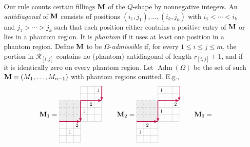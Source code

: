 \documentclass[12pt]{amsart}
\DeclareMathOperator{\Std}{\operatorname{Adm}}
\newcommand{\cell}{.28}
\newcommand{\tile}[5]{%
\begin{scope}[shift={(#1,#2)}]
  \draw[line width =.1pt, step=\cell] (0,0) grid ({#3*\cell},{#4*\cell});
  #5
\end{scope}
}
\newcommand{\phantomtile}[5]{%
\begin{scope}[shift={(#1,#2)}]
  \fill[gray!15] (0,0) rectangle ({#3*\cell},{#4*\cell});
  \draw[gray!70, dashed, step=\cell] (0,0) grid ({#3*\cell},{#4*\cell});
  #5
\end{scope}
}
\newcommand{\numcell}[3]{%
  \node at ({(#1+.5)*\cell},{(2.5-#2)*\cell}) {\scriptsize $#3$};
}
\theoremstyle{definition}
\theoremstyle{remark}
\begin{document}
Our rule counts certain fillings ${\bf M}$ of the $Q$-shape by nonnegative integers. An \emph{antidiagonal} of ${\bf M}$ consists of positions  $(i_1,j_1),\dots,(i_k,j_k)$ with $i_1<\cdots<i_k$ and $j_1>\cdots>j_k$ 
such that each position either contains a positive entry of ${\bf M}$ or lies in a 
phantom region. It is \emph{phantom} if it uses at least one position in a phantom region. Define
${\bf M}$ to be $\Omega$-\emph{admissible} if, for every $1\leq i\leq j\leq m$, the portion in ${\mathcal R}_{[i,j]}$ contains no (phantom) 
antidiagonal of length $r_{[i,j]}+1$, and if it is identically zero on every phantom region. Let $\Std(\Omega)$ be the set of 
such ${\bf M}=(M_1,\ldots,M_{n-1})$ with phantom regions omitted. E.g., 
\[{\bf M}_1=\vcenter{\hbox{\begin{tikzpicture}[scale=1.3, baseline=-.5ex]

\tile{0}{0}{3}{3}{
  \numcell{2}{0}{2}
  \numcell{1}{1}{1}
}

{\phantomtile{0}{.84}{3}{3}{
}}

\tile{.84}{.84}{3}{3}{
  \numcell{0}{1}{1}
  \numcell{1}{0}{2}
}

\tile{.84}{1.68}{3}{2}{
  \numcell{2}{1}{1}
}

\draw[purple, -{Stealth[length=2mm,width=1.5mm]}, thick] (0,.84) -- (.84,.84);
\draw[purple, -{Stealth[length=2mm,width=1.5mm]}, thick] (.84,1.68) -- (.84,.84);
\draw[purple, -{Stealth[length=2mm,width=1.5mm]}, thick] (.84,1.68) -- (1.68,1.68);
\draw[purple, -{Stealth[length=2mm,width=1.5mm]}, thick] (1.68,2.27) -- (1.68,1.68);
\end{tikzpicture}}}
\qquad
{\bf M}_2=\vcenter{\hbox{\begin{tikzpicture}[scale=1.3, baseline=-.5ex]

\tile{0}{0}{3}{3}{
  \numcell{1}{0}{2}
  \numcell{0}{1}{1}
}

{\phantomtile{0}{.84}{3}{3}{
}}

\tile{.84}{.84}{3}{3}{
  \numcell{0}{1}{1}
  \numcell{2}{0}{2}
}

\tile{.84}{1.68}{3}{2}{
  \numcell{0}{1}{1}
}

\draw[purple, -{Stealth[length=2mm,width=1.5mm]}, thick] (0,.84) -- (.84,.84);
\draw[purple, -{Stealth[length=2mm,width=1.5mm]}, thick] (.84,1.68) -- (.84,.84);
\draw[purple, -{Stealth[length=2mm,width=1.5mm]}, thick] (.84,1.68) -- (1.68,1.68);
\draw[purple, -{Stealth[length=2mm,width=1.5mm]}, thick] (1.68,2.27) -- (1.68,1.68);
\end{tikzpicture}}}
\qquad
{\bf M}_3=\vcenter{\hbox{\begin{tikzpicture}[scale=1.3, baseline=-.5ex]


\end{tikzpicture}}}\]
\end{document}
